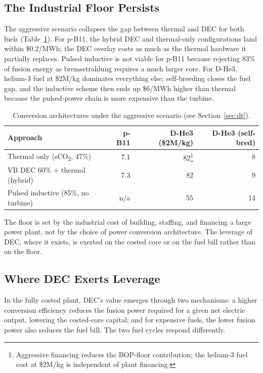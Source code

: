 \documentclass{article}
\begin{document}
\subsection{The Industrial Floor Persists}
\label{sec:converge}

The aggressive scenario collapses the gap between thermal and DEC
for both fuels (Table~\ref{tab:agg}). For p-B11, the hybrid DEC and thermal-only
configurations land within \$0.2/MWh; the DEC overlay costs
as much as the thermal hardware it partially replaces. Pulsed inductive is not viable for p-B11 because
rejecting 83\% of fusion energy as bremsstrahlung requires a much
larger core. For D-He3, helium-3 fuel at \$2M/kg dominates
everything else; self-breeding closes the fuel gap, and the
inductive scheme then ends up \$6/MWh higher than thermal because
the pulsed-power chain is more expensive than the turbine.

\begin{table}[htbp]
\caption{Conversion architectures under the aggressive scenario
(see Section~\ref{sec:dt}).}
\label{tab:agg}
\centering
\begin{tabular}{lrrr}
\toprule
Approach & p-B11 & D-He3 (\$2M/kg) & D-He3 (self-bred) \\
\midrule
Thermal only (sCO\textsubscript{2}, 47\%) & 7.1 & 82\footnote{Aggressive
financing reduces the BOP-floor contribution; the helium-3 fuel
cost at \$2M/kg is independent of plant financing.} & 8 \\
VB DEC 60\% + thermal (hybrid) & 7.3 & 82 & 9 \\
Pulsed inductive (85\%, no turbine) & n/a & 55 & 14 \\
\bottomrule
\end{tabular}
\end{table}

The floor is set by the industrial cost of building, staffing, and
financing a large power plant, not by the choice of power
conversion architecture. The leverage of DEC, where it exists, is
exerted on the costed core or on the fuel bill rather than on the
floor.

\subsection{Where DEC Exerts Leverage}
\label{sec:where}

In the fully costed plant, DEC's value emerges through two
mechanisms: a higher conversion efficiency reduces the fusion power
required for a given net electric output, lowering the costed-core
capital; and for expensive fuels, the lower fusion power also
reduces the fuel bill. The two fuel cycles respond differently.
\end{document}
